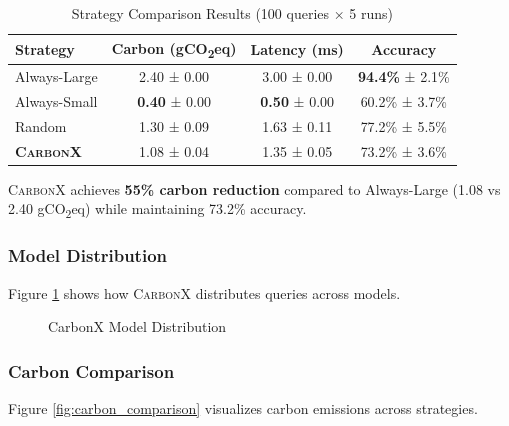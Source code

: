 \documentclass[conference]{IEEEtran}
\newcommand{\carbonx}{\textsc{CarbonX}}
\newcommand{\gco}{gCO\textsubscript{2}eq}
\begin{document}
\begin{table}[h]
\centering
\caption{Strategy Comparison Results (100 queries × 5 runs)}
\label{tab:main_results}
\begin{tabular}{lccc}
\toprule
\textbf{Strategy} & \textbf{Carbon (\gco{})} & \textbf{Latency (ms)} & \textbf{Accuracy} \\
\midrule
Always-Large & 2.40 ± 0.00 & 3.00 ± 0.00 & \textbf{94.4\%} ± 2.1\% \\
Always-Small & \textbf{0.40} ± 0.00 & \textbf{0.50} ± 0.00 & 60.2\% ± 3.7\% \\
Random & 1.30 ± 0.09 & 1.63 ± 0.11 & 77.2\% ± 5.5\% \\
\midrule
\textbf{\carbonx{}} & 1.08 ± 0.04 & 1.35 ± 0.05 & 73.2\% ± 3.6\% \\
\bottomrule
\end{tabular}
\end{table}

\carbonx{} achieves \textbf{55\% carbon reduction} compared to Always-Large (1.08 vs 2.40 \gco{}) while maintaining 73.2\% accuracy.

\subsubsection{Model Distribution}

Figure \ref{fig:distribution} shows how \carbonx{} distributes queries across models.

\begin{figure}[h]
\centering
{}
\caption{CarbonX Model Distribution}
\label{fig:distribution}
\end{figure}

\subsubsection{Carbon Comparison}

Figure \ref{fig:carbon_comparison} visualizes carbon emissions across strategies.
\end{document}
